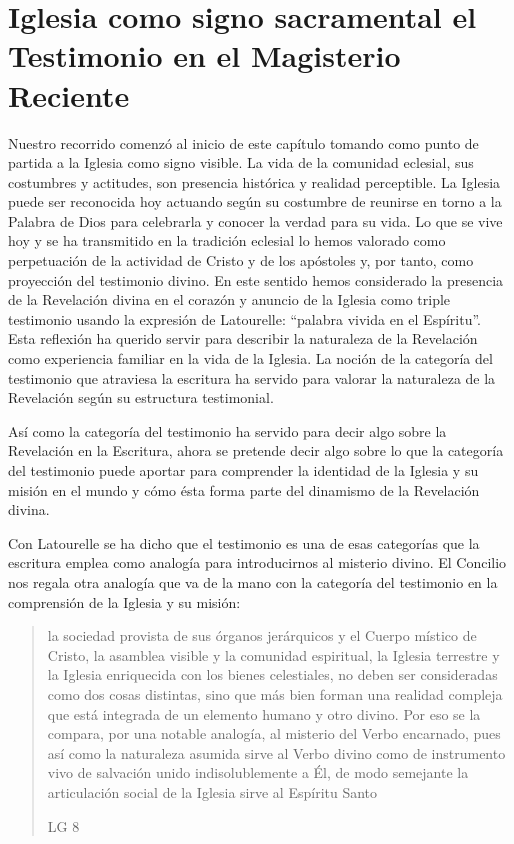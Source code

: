 \section{Iglesia como signo sacramental el Testimonio en el Magisterio Reciente}

Nuestro recorrido comenzó al inicio de este capítulo tomando como punto de
partida a la Iglesia como signo visible. La vida de la comunidad eclesial, sus
costumbres y actitudes, son presencia histórica y realidad perceptible. La
Iglesia puede ser reconocida hoy actuando según su costumbre de reunirse en
torno a la Palabra de Dios para celebrarla y conocer la verdad para su vida. Lo
que se vive hoy y se ha transmitido en la tradición eclesial lo hemos valorado
como perpetuación de la actividad de Cristo y de los apóstoles y, por tanto,
como proyección del testimonio divino. En este sentido hemos considerado la
presencia de la Revelación divina en el corazón y anuncio de la Iglesia como
triple testimonio usando la expresión de Latourelle: \enquote{palabra vivida en
  el Espíritu}. Esta reflexión ha querido servir para describir la naturaleza de
la Revelación como experiencia familiar en la vida de la Iglesia. La noción de
la categoría del testimonio que atraviesa la escritura ha servido para valorar
la naturaleza de la Revelación según su estructura testimonial.

Así como la categoría del testimonio ha servido para decir algo sobre la
Revelación en la Escritura, ahora se pretende decir algo sobre lo que la
categoría del testimonio puede aportar para comprender la identidad de la
Iglesia y su misión en el mundo y cómo ésta forma parte del dinamismo de la
Revelación divina.

Con Latourelle se ha dicho que el testimonio es una de esas categorías que la
escritura emplea como analogía para introducirnos al misterio divino. El
Concilio nos regala otra analogía que va de la mano con la categoría del
testimonio en la comprensión de la Iglesia y su misión:
\blockquote[LG 8]{la sociedad provista de sus órganos jerárquicos y el Cuerpo
  místico de Cristo, la asamblea visible y la comunidad espiritual, la Iglesia
  terrestre y la Iglesia enriquecida con los bienes celestiales, no deben ser
  consideradas como dos cosas distintas, sino que más bien forman una realidad
  compleja que está integrada de un elemento humano y otro divino. Por eso se la
  compara, por una notable analogía, al misterio del Verbo encarnado, pues así
  como la naturaleza asumida sirve al Verbo divino como de instrumento vivo de
  salvación unido indisolublemente a Él, de modo semejante la articulación
  social de la Iglesia sirve al Espíritu Santo}

